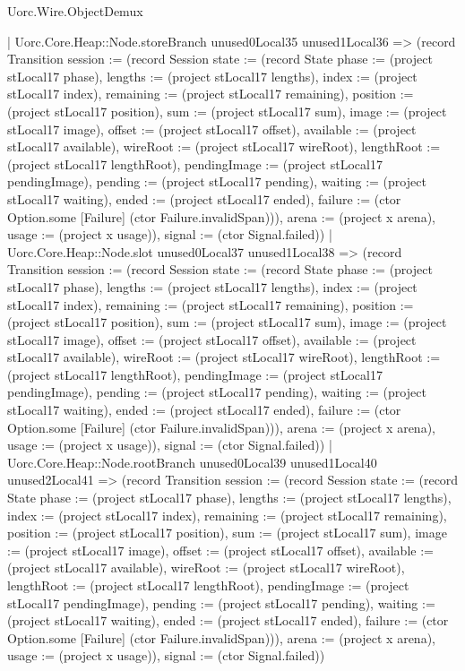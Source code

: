 \begin{lexlean}{Uorc.Wire.ObjectDemux}
\begin{semanticmodule}
{        | Uorc.Core.Heap::Node.storeBranch unused0Local35 unused1Local36 => (record Transition {session := (record Session {state := (record State {phase := (project stLocal17 phase), lengths := (project stLocal17 lengths), index := (project stLocal17 index), remaining := (project stLocal17 remaining), position := (project stLocal17 position), sum := (project stLocal17 sum), image := (project stLocal17 image), offset := (project stLocal17 offset), available := (project stLocal17 available), wireRoot := (project stLocal17 wireRoot), lengthRoot := (project stLocal17 lengthRoot), pendingImage := (project stLocal17 pendingImage), pending := (project stLocal17 pending), waiting := (project stLocal17 waiting), ended := (project stLocal17 ended), failure := (ctor Option.some [Failure] (ctor Failure.invalidSpan))}), arena := (project x arena), usage := (project x usage)}), signal := (ctor Signal.failed)})
        | Uorc.Core.Heap::Node.slot unused0Local37 unused1Local38 => (record Transition {session := (record Session {state := (record State {phase := (project stLocal17 phase), lengths := (project stLocal17 lengths), index := (project stLocal17 index), remaining := (project stLocal17 remaining), position := (project stLocal17 position), sum := (project stLocal17 sum), image := (project stLocal17 image), offset := (project stLocal17 offset), available := (project stLocal17 available), wireRoot := (project stLocal17 wireRoot), lengthRoot := (project stLocal17 lengthRoot), pendingImage := (project stLocal17 pendingImage), pending := (project stLocal17 pending), waiting := (project stLocal17 waiting), ended := (project stLocal17 ended), failure := (ctor Option.some [Failure] (ctor Failure.invalidSpan))}), arena := (project x arena), usage := (project x usage)}), signal := (ctor Signal.failed)})
        | Uorc.Core.Heap::Node.rootBranch unused0Local39 unused1Local40 unused2Local41 => (record Transition {session := (record Session {state := (record State {phase := (project stLocal17 phase), lengths := (project stLocal17 lengths), index := (project stLocal17 index), remaining := (project stLocal17 remaining), position := (project stLocal17 position), sum := (project stLocal17 sum), image := (project stLocal17 image), offset := (project stLocal17 offset), available := (project stLocal17 available), wireRoot := (project stLocal17 wireRoot), lengthRoot := (project stLocal17 lengthRoot), pendingImage := (project stLocal17 pendingImage), pending := (project stLocal17 pending), waiting := (project stLocal17 waiting), ended := (project stLocal17 ended), failure := (ctor Option.some [Failure] (ctor Failure.invalidSpan))}), arena := (project x arena), usage := (project x usage)}), signal := (ctor Signal.failed)})
}
\end{semanticmodule}
\end{lexlean}
